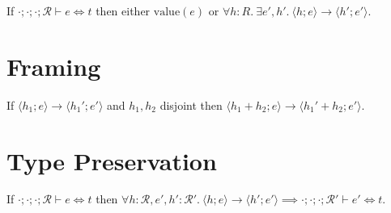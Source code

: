 \documentclass[11pt]{article}%
\newcommand{\ctxR}{\mathcal{R}}%
\newcommand{\stepsto}{\longrightarrow}%
\newcommand{\sych}{\Leftrightarrow}%
\newcommand{\hconf}[2]{\langle #1 ; #2 \rangle}%
\begin{document}
If $\cdot ; \cdot ; \cdot ; \ctxR \vdash e \sych t$ then
either $\mathrm{value}(e)$ or $\forall h : R.\ \exists e' , h' .\ \hconf{h}{e}
\stepsto \hconf{h'}{e'}$.

\section{Framing}

If $\hconf{h_1}{e} \stepsto \hconf{h_1'}{e'}$ and $h_1, h_2$ disjoint then
$\hconf{h_1 + h_2}{e} \stepsto \hconf{h_1' + h_2}{e'}$.

\section{Type Preservation}

If $\cdot ; \cdot ; \cdot ; \ctxR \vdash e \sych t$ then
$\forall h : \ctxR, e' , h' : \ctxR' .\ \hconf{h}{e} \stepsto \hconf{h'}{e'}
\implies \cdot ; \cdot ; \cdot ; \ctxR' \vdash e' \sych t$.
\end{document}
